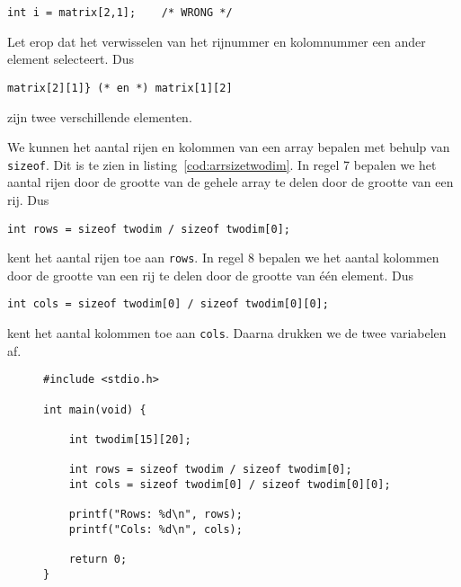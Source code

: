 \begin{lstlisting}[style=lstoneline]
int i = matrix[2,1];    /* WRONG */
\end{lstlisting}

Let erop dat het verwisselen van het rijnummer en kolomnummer een ander element selecteert. Dus

\begin{lstlisting}[style=lstoneline]
matrix[2][1]} (* en *) matrix[1][2]
\end{lstlisting}

zijn twee verschillende elementen.

We kunnen het aantal rijen en kolommen van een array bepalen met behulp van \texttt{sizeof}. Dit is te zien in listing~\ref{cod:arrsizetwodim}. In regel 7 bepalen we het aantal rijen door de grootte van de gehele array te delen door de grootte van een rij. Dus

\begin{lstlisting}[style=lstoneline]
int rows = sizeof twodim / sizeof twodim[0];
\end{lstlisting}

kent het aantal rijen toe aan \texttt{rows}. In regel 8 bepalen we het aantal kolommen door de grootte van een rij te delen door de grootte van één element. Dus

\begin{lstlisting}[style=lstoneline]
int cols = sizeof twodim[0] / sizeof twodim[0][0];
\end{lstlisting}

kent het aantal kolommen toe aan \texttt{cols}. Daarna drukken we de twee variabelen af.

\begin{figure}[!t]
\begin{lstlisting}[caption=Bepalen van het aantal rijen en kolommen.,label=cod:arrsizetwodim]
#include <stdio.h>

int main(void) {

	int twodim[15][20];

	int rows = sizeof twodim / sizeof twodim[0];
	int cols = sizeof twodim[0] / sizeof twodim[0][0];

	printf("Rows: %d\n", rows);
	printf("Cols: %d\n", cols);

	return 0;
}
\end{lstlisting}
\end{figure}


